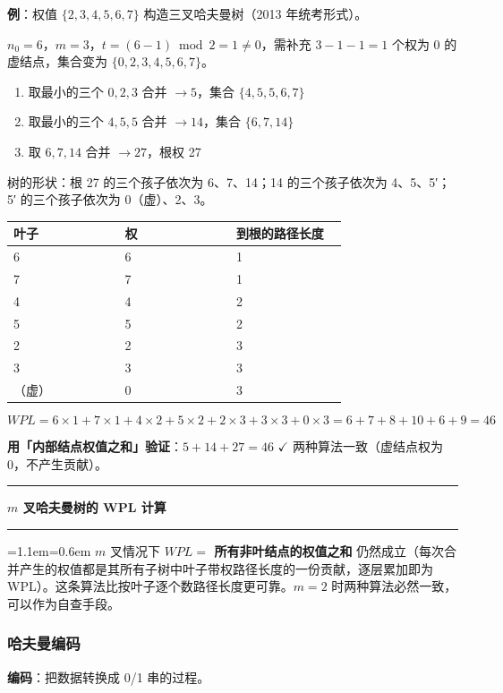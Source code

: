 \documentclass[11pt,openany,UTF8]{ctexbook}
\newcommand{\callouthead}[2]{%
  \par\addvspace{7pt}\noindent
  {\color{#1}\rule[-0.15em]{3pt}{1.05em}}\hspace{0.5em}%
  {\bfseries\color{#1}#2}\par\nobreak\vspace{-0.35em}%
  {\color{rulesep}\hrule height 0.4pt}\nobreak\vspace{0.45em}%
  \begingroup\small\setlength{\parindent}{0pt}%
  \leftskip=1.1em\rightskip=0.6em\noindent\ignorespaces}
\newcommand{\calloutend}{\par\endgroup\addvspace{7pt}}
\newenvironment{callwarn}[1]{\callouthead{warnbar}{#1}}{\calloutend}
\begin{document}
\textbf{例}：权值 $\{2,3,4,5,6,7\}$ 构造三叉哈夫曼树（2013 年统考形式）。

$n_0=6$，$m=3$，$t=(6-1)\bmod 2=1\ne0$，需补充 $3-1-1=1$ 个权为 0 的虚结点，集合变为 $\{0,2,3,4,5,6,7\}$。

\begin{enumerate}
\item 取最小的三个 $0,2,3$ 合并 $\to5$，集合 $\{4,5,5,6,7\}$
\item 取最小的三个 $4,5,5$ 合并 $\to14$，集合 $\{6,7,14\}$
\item 取 $6,7,14$ 合并 $\to27$，根权 27
\end{enumerate}
树的形状：根 27 的三个孩子依次为 6、7、14；14 的三个孩子依次为 4、5、5′；5′ 的三个孩子依次为 0（虚）、2、3。

\begingroup\small\setlength{\tabcolsep}{4.0pt}
\begin{longtable}{@{}L{0.3095\linewidth}L{0.3095\linewidth}L{0.3095\linewidth}@{}}
\toprule
\textbf{叶子} & \textbf{权} & \textbf{到根的路径长度} \\
\midrule
{} & 6 & 1 \\
7 & 7 & 1 \\
4 & 4 & 2 \\
5 & 5 & 2 \\
2 & 2 & 3 \\
3 & 3 & 3 \\
（虚） & 0 & 3 \\
\bottomrule
\end{longtable}
\endgroup

\[WPL=6\times1+7\times1+4\times2+5\times2+2\times3+3\times3+0\times3=6+7+8+10+6+9=46\]

\textbf{用「内部结点权值之和」验证}：$5+14+27=46$ $\checkmark$ 两种算法一致（虚结点权为 0，不产生贡献）。

\begin{callwarn}{$m$ 叉哈夫曼树的 WPL 计算}
$m$ 叉情况下 \textbf{$WPL=$ 所有非叶结点的权值之和} 仍然成立（每次合并产生的权值都是其所有子树中叶子带权路径长度的一份贡献，逐层累加即为 WPL）。这条算法比按叶子逐个数路径长度更可靠。$m=2$ 时两种算法必然一致，可以作为自查手段。

\end{callwarn}

\subsubsection{哈夫曼编码}

\textbf{编码}：把数据转换成 0/1 串的过程。
\end{document}
